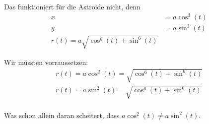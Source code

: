 \documentclass[a4paper,german,12pt,smallheadings]{scrartcl}
\begin{document}
Das funktioniert für die Astroide nicht, denn
\begin{align*}
  x &= a \cos^3(t)\\
  y &= a\sin^3(t) \\
  r(t) = a\sqrt{\cos^6(t) + \sin^6(t)}
\end{align*}

Wir müssten vorraussetzen:
\begin{align*}
  r(t) = a \cos^2(t) = \sqrt{\cos^6(t) + \sin^6(t)} \\
  r(t) = a \sin^2(t) = \sqrt{\cos^6(t) + \sin^6(t)} \\
\end{align*}

Was schon allein daran scheitert, dass $a \cos^2(t) \neq a \sin^2(t)$.
\end{document}
